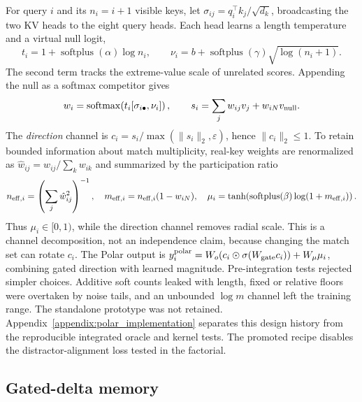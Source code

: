\documentclass{article}
\begin{document}
For query $i$ and its $n_i=i+1$ visible keys, let $\sigma_{ij}=q_i^\top k_j/\sqrt{d_k}$, broadcasting the two KV heads to the eight query heads. Each head learns a length temperature and a virtual null logit,
\begin{equation}
 t_i=1+\operatorname{softplus}(\alpha)\log n_i,\qquad
 \nu_i=b+\operatorname{softplus}(\gamma)\sqrt{\log(n_i+1)}.
\label{eq:length}
\end{equation}
The second term tracks the extreme-value scale of unrelated scores. Appending the null as a softmax competitor gives
\begin{equation}
 w_i=\operatorname{softmax}\!\left(t_i[\sigma_{i\bullet},\nu_i]\right),\qquad
 s_i=\sum_jw_{ij}v_j+w_{iN}v_{\rm null}.
\end{equation}
The \emph{direction} channel is $c_i=s_i/\max(\lVert s_i\rVert_2,\varepsilon)$, hence $\lVert c_i\rVert_2\leq1$. To retain bounded information about match multiplicity, real-key weights are renormalized as $\hat w_{ij}=w_{ij}/\sum_kw_{ik}$ and summarized by the participation ratio
\begin{equation}
 n_{{\rm eff},i}=\left(\sum_j\hat w_{ij}^2\right)^{-1},\quad
 m_{{\rm eff},i}=n_{{\rm eff},i}(1-w_{iN}),\quad
 \mu_i=\tanh\!\left(\operatorname{softplus}(\beta)\log(1+m_{{\rm eff},i})\right).
\end{equation}
Thus $\mu_i\in[0,1)$, while the direction channel removes radial scale. This is a channel decomposition, not an independence claim, because changing the match set can rotate $c_i$. The Polar output is $y_i^{\rm polar}=W_o(c_i\odot\sigma(W_{\rm gate}c_i))+W_\mu\mu_i$, combining gated direction with learned magnitude. Pre-integration tests rejected simpler choices. Additive soft counts leaked with length, fixed or relative floors were overtaken by noise tails, and an unbounded $\log m$ channel left the training range. The standalone prototype was not retained. Appendix~\ref{appendix:polar_implementation} separates this design history from the reproducible integrated oracle and kernel tests. The promoted recipe disables the distractor-alignment loss tested in the factorial.

\subsection{Gated-delta memory}
\end{document}
